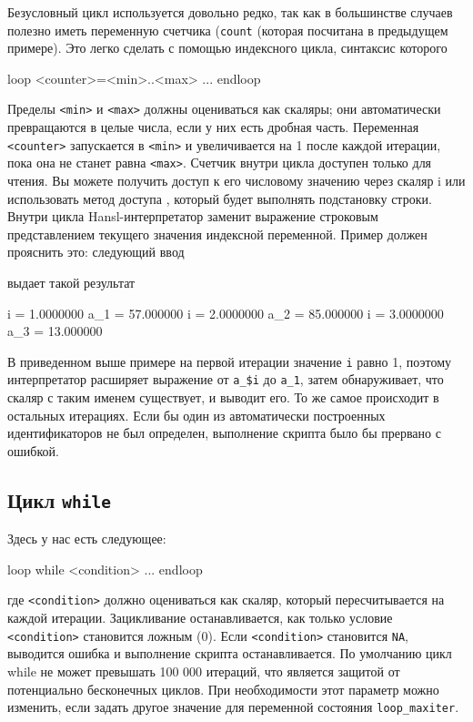 Безусловный цикл используется довольно редко, так как в большинстве
случаев полезно иметь переменную счетчика (\texttt{count} (которая
посчитана в предыдущем примере). Это легко сделать с помощью
индексного цикла, синтаксис которого
\begin{code}
loop <counter>=<min>..<max>
   ...
endloop
\end{code}
Пределы \texttt{<min>} и \texttt{<max>} должны оцениваться как
скаляры; они автоматически превращаются в целые числа, если у них есть
дробная часть. Переменная \texttt{<counter>} запускается в
\texttt{<min>} и увеличивается на 1 после каждой итерации, пока она не
станет равна \texttt{<max>}.  Счетчик внутри цикла доступен только для
чтения. Вы можете получить доступ к его числовому значению через
скаляр i или использовать метод доступа , который будет
выполнять подстановку строки. Внутри цикла Hansl-интерпретатор заменит
выражение  строковым представлением текущего значения
индексной переменной. Пример должен прояснить это: следующий ввод


выдает такой результат
\begin{code}
    i = 1.0000000
  a_1 = 57.000000
    i = 2.0000000
  a_2 = 85.000000
    i = 3.0000000
  a_3 = 13.000000
\end{code}

В приведенном выше примере на первой итерации значение \texttt{i}
равно 1, поэтому интерпретатор расширяет выражение от \verb|a_$i|  до
\verb|a_1|, затем обнаруживает, что скаляр с таким именем существует,
и выводит его. То же самое происходит в остальных итерациях. Если бы
один из автоматически построенных идентификаторов не был определен,
выполнение скрипта было бы прервано с ошибкой.

\subsection{Цикл \texttt{while}}

Здесь у нас есть следующее:
\begin{code}
loop while <condition>
   ...
endloop
\end{code}
где \texttt{<condition>} должно оцениваться как скаляр, который
пересчитывается на каждой итерации. Зацикливание останавливается, как
только условие \texttt{<condition>} становится ложным (0). Если
\texttt{<condition>} становится \texttt{NA}, выводится ошибка и
выполнение скрипта останавливается. По умолчанию цикл while не может
превышать 100 000 итераций, что является защитой от потенциально
бесконечных циклов. При необходимости этот параметр можно изменить,
если задать другое значение для переменной состояния
\texttt{loop\_maxiter}.

